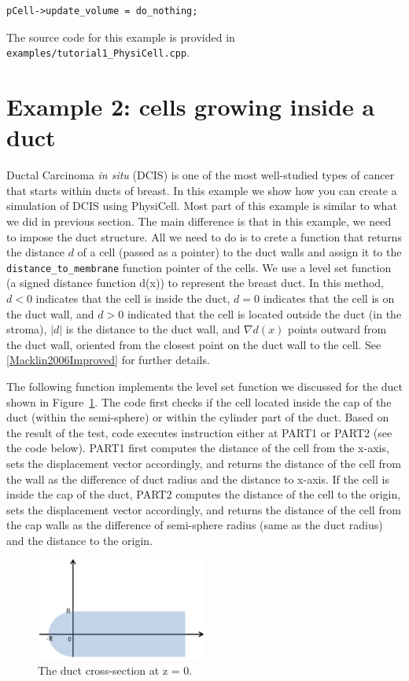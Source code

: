 \documentclass[11pt]{article}
\begin{document}
\begin{verbatim}
pCell->update_volume = do_nothing;
\end{verbatim}

The source code for this example is provided in \verb:examples/tutorial1_PhysiCell.cpp:.


\section{Example 2: cells growing inside a duct}

Ductal Carcinoma \textit{in situ} (DCIS) is one of the most well-studied types of cancer that starts within ducts of breast. In this
example we show how you can create a simulation of DCIS using PhysiCell. Most part of this example is similar to what we did in previous section. 
The main difference is that in this example, we need to impose the duct structure. All we need to do is to crete a function that returns the distance $d$
of a cell (passed as a pointer) to the duct walls and assign it to the \verb:distance_to_membrane: function pointer of the cells. We use a level set function (a signed distance function d(x)) to represent the breast duct. In this method, $d < 0$ indicates that the cell is inside the duct, $d = 0$ indicates that the cell is on the duct wall, and $d > 0$ indicated that the cell is located outside the duct (in the stroma), $|d|$ is the distance to the duct wall, and $\nabla d(x)$ points outward from the duct wall, oriented from the closest point on the duct wall to the cell. See \ref{Macklin2006Improved} for further details.

The following function implements the level set function we discussed for the duct shown in Figure~\ref{fig:duct_structure}. The code first checks if the cell located inside the cap of the duct (within the semi-sphere) or within the cylinder part of the duct. Based on the result of the test, code executes instruction either at PART1 or PART2 (see the code below). PART1 first computes the distance of the cell from the x-axis, sets the displacement vector accordingly, and returns the distance of the cell from the wall as the difference of duct radius and the distance to x-axis. If the cell is inside the cap of the duct, PART2 computes the distance of the cell to the origin, sets the displacement vector accordingly, and returns the distance of the cell from the cap walls as the difference of semi-sphere radius (same as the duct radius) and the distance to the origin.

\begin{figure}[h]
\centering
\includegraphics[width=0.5\textwidth]{./images/duct_structure.png} 
\caption{ The duct cross-section at z = 0.  }
\label{fig:duct_structure}
\end{figure}
\end{document}
